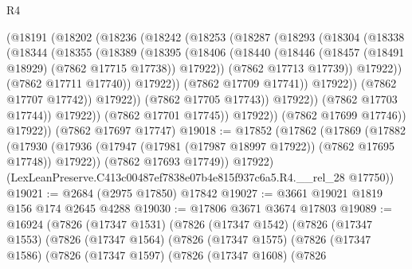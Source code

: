 \begin{lexlean}{R4}
\begin{coremodule}
                        (@18191
                          (@18202
                            (@18236
                              (@18242
                                (@18253
                                  (@18287
                                    (@18293
                                      (@18304
                                        (@18338
                                          (@18344
                                            (@18355
                                              (@18389
                                                (@18395
                                                  (@18406
                                                    (@18440
                                                      (@18446
                                                        (@18457
                                                          (@18491 @18929)
                                                          (@7862 @17715 @17738))
                                                        @17922))
                                                    (@7862 @17713 @17739))
                                                  @17922))
                                              (@7862 @17711 @17740))
                                            @17922))
                                        (@7862 @17709 @17741))
                                      @17922))
                                  (@7862 @17707 @17742))
                                @17922))
                            (@7862 @17705 @17743))
                          @17922))
                      (@7862 @17703 @17744))
                    @17922))
                (@7862 @17701 @17745))
              @17922))
          (@7862 @17699 @17746))
        @17922))
    (@7862 @17697 @17747)
@19018 := @17852
    (@17862
      (@17869
        (@17882
          (@17930 (@17936 (@17947 (@17981 (@17987 @18997 @17922)) (@7862 @17695 @17748)) @17922))
          (@7862 @17693 @17749))
        @17922)
      (LexLeanPreserve.C413c00487ef7838e07b4e815f937c6a5.R4.__rel_28 @17750))
@19021 := @2684 (@2975 @17850) @17842
@19027 := @3661 @19021 @1819 @156 @174 @2645 @4288
@19030 := @17806 @3671 @3674 @17803
@19089 := @16924
    (@7826
      (@17347 @1531)
      (@7826
        (@17347 @1542)
        (@7826
          (@17347 @1553)
          (@7826
            (@17347 @1564)
            (@7826
              (@17347 @1575)
              (@7826
                (@17347 @1586)
                (@7826
                  (@17347 @1597)
                  (@7826
                    (@17347 @1608)
                    (@7826

\end{coremodule}
\end{lexlean}
